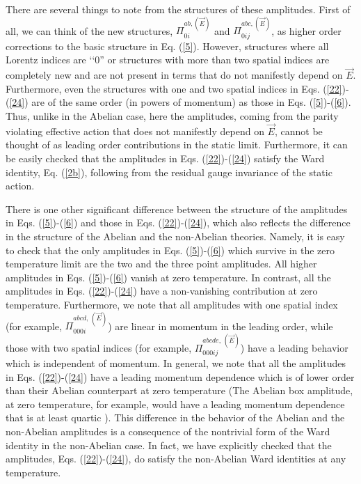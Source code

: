 \documentclass[a4paper,12pt]{article}
\begin{document}
There are several things to note from the structures of these
amplitudes. First of all, we can think of the new structures,
$\Pi_{0i}^{ab,(\vec{E})}$ and $\Pi_{0ij}^{abc,(\vec{E})}$, as higher
order  corrections to
the basic structure in Eq. (\ref{5}). However, structures where all
Lorentz indices are \lq\lq$0$'' or structures with more than two
spatial indices are completely new and are not present in terms that
do not manifestly depend on $\vec{E}$. Furthermore, even the
structures with  one
and two spatial indices in Eqs. (\ref{22})-(\ref{24}) are of the same
order (in powers of momentum) as those in
Eqs. (\ref{5})-(\ref{6}). Thus, unlike in the Abelian case, here the
amplitudes, coming from the parity violating effective action that
does not manifestly depend on $\vec{E}$, cannot be thought of as
leading  order
contributions in the static limit. Furthermore, it can be easily
checked that the amplitudes in Eqs. (\ref{22})-(\ref{24}) satisfy the
Ward identity, Eq. (\ref{2b}), following from the residual gauge
invariance of the static action.

There is one other significant difference between the structure of the
amplitudes in Eqs. (\ref{5})-(\ref{6}) and those in
Eqs. (\ref{22})-(\ref{24}), which also reflects the difference in the
structure of the Abelian and the non-Abelian theories. Namely, it is
easy to check that the only amplitudes in Eqs. (\ref{5})-(\ref{6}) which
survive in the zero temperature limit are the two and the three point
amplitudes. All higher amplitudes in Eqs. (\ref{5})-(\ref{6}) vanish at
zero temperature. In contrast, all the amplitudes in
Eqs. (\ref{22})-(\ref{24}) have a non-vanishing contribution at zero
temperature. Furthermore, we note that all amplitudes with one spatial
index (for example, $\Pi_{000i}^{abcd,\,(\vec{E})}$) are linear in
momentum in the leading order, while those with two spatial indices
(for example, $\Pi_{000ij}^{abcde,\,(\vec{E})}$) have a leading
behavior which is independent of momentum. In general, we note that
all the amplitudes in Eqs. (\ref{22})-(\ref{24}) have a leading momentum
dependence which is of lower order than their Abelian counterpart at
zero temperature \cite{coleman:1985zi}
(The Abelian box amplitude, at zero temperature, for
example, would have a leading momentum dependence that is at least
quartic \cite{Brandt:2000dd}). 
This difference in the behavior of the Abelian and the
non-Abelian amplitudes is a consequence of the nontrivial form of the
Ward identity in the non-Abelian case. In fact, we have explicitly checked
that the amplitudes, Eqs. (\ref{22})-(\ref{24}), do satisfy the
non-Abelian Ward identities at any temperature.
\end{document}
